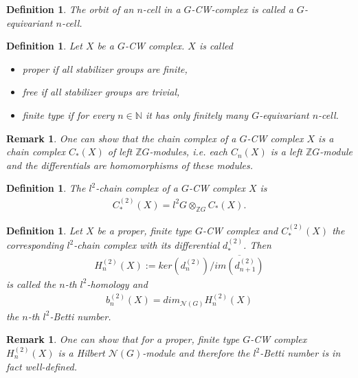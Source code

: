 \documentclass[12pt,a4paper]{scrartcl}
\newtheorem{Definition}[Theorem]{Definition}
\newtheorem{Remark}[Theorem]{Remark}
\numberwithin{equation}{section}
\newcommand{\Z}{\mathbb{Z}} %
\newcommand{\N}{\mathbb{N}} %
\newcommand{\2}{\mathbb{Z} / 2 \mathbb{Z}}
\newcommand{\1}{\overline{1}}
\newcommand{\0}{\overline{0}}
\begin{document}
\begin{Definition}
	The orbit of an $n$-cell in a $G$-CW-complex is called a $G$-equivariant $n$-cell.
\end{Definition}

\begin{Definition}
	Let $X$ be a $G$-CW complex. $X$ is called
	\begin{itemize}
		\item proper if all stabilizer groups are finite,
		\item free if all stabilizer groups are trivial,
		\item finite type if for every $n \in \N$ it has only finitely many $G$-equivariant $n$-cell.
	\end{itemize}
\end{Definition}
\begin{Remark}
	One can show that the chain complex of a $G$-CW complex $X$ is a chain complex $C_*(X)$ of left $\Z G$-modules, i.e. each $C_n(X)$ is a left $\Z G$-module and the differentials are homomorphisms of these modules.
\end{Remark}
\begin{Definition}
	The $l^2$-chain complex of a $G$-CW complex $X$ is
	\begin{align*}
		C_*^{(2)}(X) = l^2G \otimes_{\Z G} C_*(X).
	\end{align*}
\end{Definition}

\begin{Definition}
	Let $X$ be a proper, finite type $G$-CW complex and $C_*^{(2)}(X)$ the corresponding $l^2$-chain complex with its differential $d_*^{(2)}$. Then 
	\begin{align*}
		H_n^{(2)}(X) := ker(d_n^{(2)}) / \overline{im(d_{n+1}^{(2)})}
	\end{align*}
	is called the $n$-th $l^2$-homology and 
	\begin{align*}
		b_n^{(2)}(X)=dim_{\mathcal{N}(G)}H_n^{(2)}(X)
	\end{align*}
	the $n$-th $l^2$-Betti number.
\end{Definition}
\begin{Remark}
	One can show that for a proper, finite type $G$-CW complex $H_n^{(2)}(X)$ is a Hilbert $\mathcal{N}(G)$-module and therefore the $l^2$-Betti number is in fact well-defined.
\end{Remark}
\end{document}
